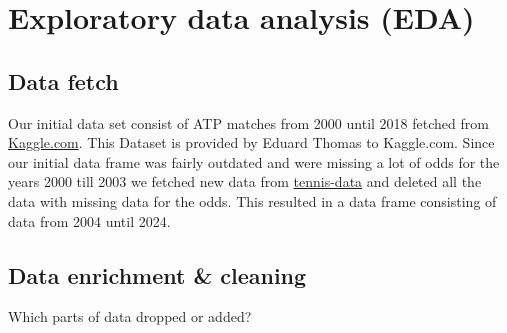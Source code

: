 \documentclass[preprint,aps,nofootinbib,a4paper,superscriptaddress,longbibliography,amsfonts,amssymb,amsmath,titlepage]{revtex4-2}
\begin{document}
\section{Exploratory data analysis (EDA)}


\subsection{Data fetch}

Our initial data set consist of ATP matches from 2000 until 2018 fetched from \href{https://www.kaggle.com/datasets/edouardthomas/atp-matches-dataset}{Kaggle.com}. This Dataset is provided by Eduard Thomas to Kaggle.com. Since our initial data frame was fairly outdated and were missing a lot of odds for the years 2000 till 2003 we fetched new data from \href{http://tennis-data.co.uk/}{tennis-data} and deleted all the data with missing data for the odds. This resulted in a data frame consisting of data from 2004 until 2024.

\subsection{Data enrichment \& cleaning}
Which parts of data dropped or added?
\end{document}
